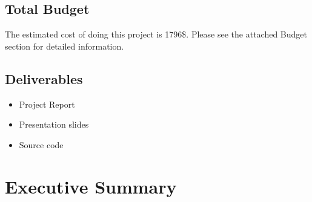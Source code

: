 \documentclass[a4paper,11pt]{article}
\begin{document}
\subsection{Total Budget} 
The estimated cost of doing this project is 1796\$. Please see the attached Budget section for detailed information.
\subsection{Deliverables}
\begin{itemize}
\item Project Report
\item Presentation slides
\item Source code
\end{itemize}
\pagebreak

\section{Executive Summary}
\end{document}
